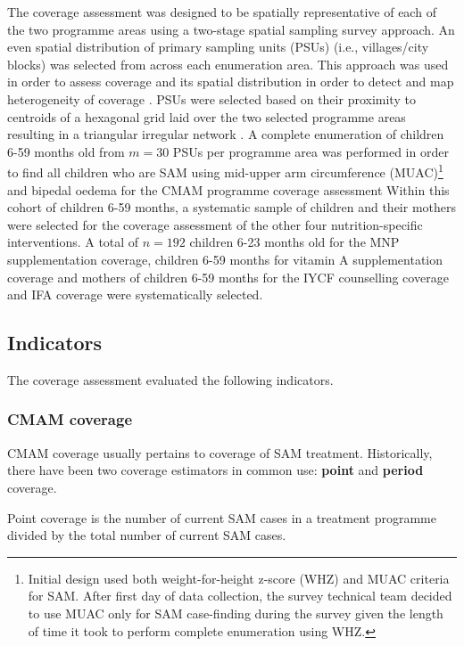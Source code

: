 \documentclass[12pt,a4paper]{article}
\let\rmarkdownfootnote\footnote%
\def\footnote{\protect\rmarkdownfootnote}
\begin{document}
The coverage assessment was designed to be spatially representative of each of the two programme areas using a two-stage spatial sampling survey approach. An even spatial distribution of primary sampling units (PSUs) (i.e., villages/city blocks) was selected from across each enumeration area. This approach was used in order to assess coverage and its spatial distribution in order to detect and map heterogeneity of coverage \citep[\citet{Diggle:2014tk}]{Elliott:2004cg}. PSUs were selected based on their proximity to centroids of a hexagonal grid laid over the two selected programme areas resulting in a triangular irregular network \citep[\citet{Elliot:2000vs}]{Isaaks:1989uk}. A complete enumeration of children 6-59 months old from \(m = 30\) PSUs per programme area was performed in order to find all children who are SAM using mid-upper arm circumference (MUAC)\footnote{Initial design used both weight-for-height z-score (WHZ) and MUAC criteria for SAM. After first day of data collection, the survey technical team decided to use MUAC only for SAM case-finding during the survey given the length of time it took to perform complete enumeration using WHZ.} and bipedal oedema for the CMAM programme coverage assessment Within this cohort of children 6-59 months, a systematic sample of children and their mothers were selected for the coverage assessment of the other four nutrition-specific interventions. A total of \(n = 192\) children 6-23 months old for the MNP supplementation coverage, children 6-59 months for vitamin A supplementation coverage and mothers of children 6-59 months for the IYCF counselling coverage and IFA coverage were systematically selected.

\hypertarget{indicators}{%
\subsection{Indicators}\label{indicators}}

The coverage assessment evaluated the following indicators.

\hypertarget{cmam-coverage}{%
\subsubsection{CMAM coverage}\label{cmam-coverage}}

CMAM coverage usually pertains to coverage of SAM treatment. Historically, there have been two coverage estimators in common use: \textbf{point} and \textbf{period} coverage.

Point coverage is the number of current SAM cases in a treatment programme divided by the total number of current SAM cases.
\end{document}
